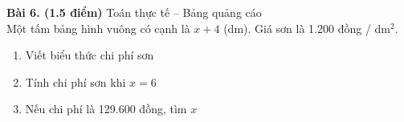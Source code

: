 \documentclass[12pt]{article}
\begin{document}
\begin{center}
\begin{minipage}{0.9\textwidth}
\textbf{Bài 6. (1.5 điểm)} Toán thực tế – Bảng quảng cáo \\
Một tấm bảng hình vuông có cạnh là $x + 4$ (dm). Giá sơn là 1.200 đồng / dm$^2$.
\begin{enumerate}
  \renewcommand{\labelenumi}{(\alph{enumi})}
    \item Viết biểu thức chi phí sơn
    \item Tính chi phí sơn khi $x = 6$
    \item Nếu chi phí là 129.600 đồng, tìm $x$
\end{enumerate}
\end{minipage}
\end{center}
\end{document}
